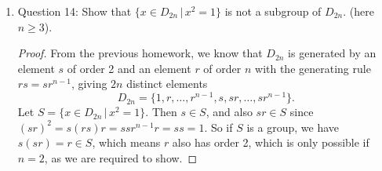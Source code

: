 \documentclass{article}
\begin{document}
\begin{enumerate}
\begin{enumerate}
      \item Question 14: Show that $\{x\in D_{2n}\,|\,x^2=1\}$ is not a
        subgroup of $D_{2n}$. (here $n\geq3$).

        \begin{proof}
          From the previous homework, we know that $D_{2n}$ is generated by
          an element $s$ of order 2 and an element $r$ of order $n$ with
          the generating rule $rs=sr^{n-1}$, giving $2n$ distinct elements
          \begin{equation*}
            D_{2n} = \{1,r,\ldots,r^{n-1},s,sr,\ldots,sr^{n-1}\}.
          \end{equation*}
          Let $S=\{x\in D_{2n}\,|\,x^2=1\}$. Then $s\in S$, and also $sr\in
          S$ since $(sr)^2=s(rs)r=ssr^{n-1}r=ss=1$. So if $S$ is a group,
          we have $s(sr)=r\in S$, which means $r$ also has order 2, which
          is only possible if $n=2$, as we are required to show. 
        \end{proof}
    \end{enumerate}
\end{enumerate}
\end{document}

